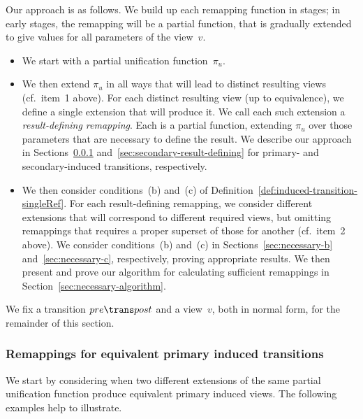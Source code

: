 Our approach is as follows.  We build up each remapping function in stages; in
early stages, the remapping will be a partial function, that is gradually
extended to give values for all parameters of the view~$v$. 
\begin{itemize}
\item We start with a partial unification function~$\pi_u$. 

\item We then extend $\pi_u$ in all ways that will lead to distinct resulting
  views (cf.~item~1 above).  For each distinct resulting view (up to
  equivalence), we define a single extension that will produce it.  We call
  each such extension a \emph{result-defining remapping}.  Each is a partial
  function, extending $\pi_u$ over those parameters that are necessary to
  define the result.  
  We describe our approach in Sections~\ref{sec:primary-result-defining}
  and~\ref{sec:secondary-result-defining} for primary- and secondary-induced
  transitions, respectively.

\item We then consider conditions~(b) and~(c) of
  Definition~\ref{def:induced-transition-singleRef}.  For each result-defining
  remapping, we consider different extensions that will correspond to
  different required views, but omitting remappings that requires a
  proper superset of those for another (cf.~item~2 above).  
  We consider conditions~(b) and~(c) in Sections~\ref{sec:necessary-b}
  and~\ref{sec:necessary-c}, respectively, proving appropriate results.  We
  then present and prove our algorithm for calculating sufficient
  remappings in Section~\ref{sec:necessary-algorithm}.

\end{itemize}

We fix a transition $pre \trans post$ and a view~$v$, both in normal form,
for the remainder of this section.



\subsubsection{Remappings for equivalent primary induced transitions}
\label{sec:primary-result-defining}

We start by considering when two different extensions of the same partial
unification function produce equivalent primary induced views.  The following
examples help to illustrate. 

